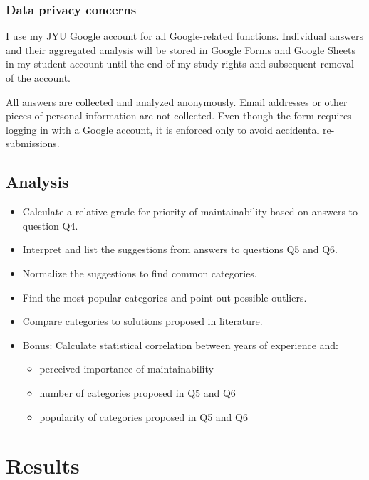 \documentclass[utf8,english]{gradu3}
\begin{document}
\subsection{Data privacy concerns}
I use my JYU Google account for all Google-related functions.
Individual answers and their aggregated analysis will be stored in Google Forms and
Google Sheets in my student account until the end of my study rights and
subsequent removal of the account.

All answers are collected and analyzed anonymously.
Email addresses or other pieces of personal information are not collected.
Even though the form requires logging in with a Google account, it is enforced
only to avoid accidental re-submissions.


\section{Analysis}

\begin{itemize}
  \item Calculate a relative grade for priority of maintainability based on answers to question Q4.
  \item Interpret and list the suggestions from answers to questions Q5 and Q6.
  \item Normalize the suggestions to find common categories.
  \item Find the most popular categories and point out possible outliers.
  \item Compare categories to solutions proposed in literature.
  \item Bonus: Calculate statistical correlation between years of experience and:
        \begin{itemize}
          \item perceived importance of maintainability
          \item number of categories proposed in Q5 and Q6
          \item popularity of categories proposed in Q5 and Q6
        \end{itemize}
\end{itemize}


\chapter{Results}
\end{document}

